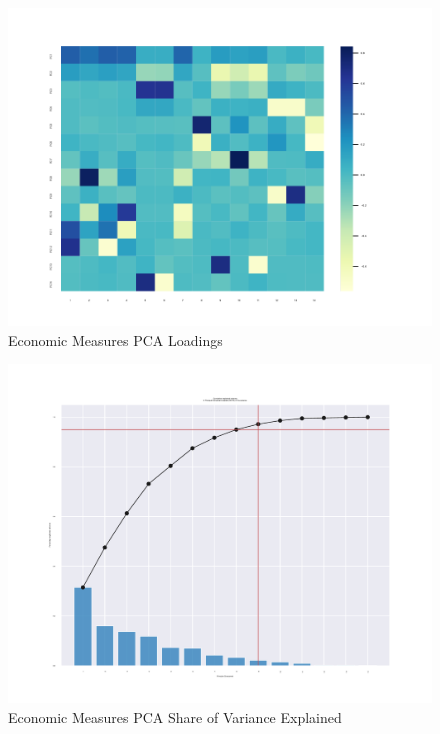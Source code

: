 \documentclass[12pt]{article}
\begin{document}
        \begin{figure}[h!]
            \centering
            \caption{Economic Measures PCA Loadings}
            \label{Econ_Loadings}	
            \includegraphics[width=\linewidth,keepaspectratio=true]{../Output/Figures/Econ_Indicator_Loadings_combined.pdf}
        \end{figure}

        \begin{figure}[h!]
            \centering
            \caption{Economic Measures PCA Share of Variance Explained}
            \label{Econ_Share_Explained}	
            \includegraphics[width=\linewidth,keepaspectratio=true]{../Output/Figures/Econ_Indicator_Share_Explained_combined.pdf}
        \end{figure}
\end{document}
